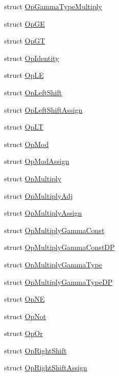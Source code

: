 \begin{DoxyCompactItemize}
\item 
struct \mbox{\hyperlink{structENSEM_1_1OpGammaTypeMultiply}{Op\+Gamma\+Type\+Multiply}}
\item 
struct \mbox{\hyperlink{structENSEM_1_1OpGE}{Op\+GE}}
\item 
struct \mbox{\hyperlink{structENSEM_1_1OpGT}{Op\+GT}}
\item 
struct \mbox{\hyperlink{structENSEM_1_1OpIdentity}{Op\+Identity}}
\item 
struct \mbox{\hyperlink{structENSEM_1_1OpLE}{Op\+LE}}
\item 
struct \mbox{\hyperlink{structENSEM_1_1OpLeftShift}{Op\+Left\+Shift}}
\item 
struct \mbox{\hyperlink{structENSEM_1_1OpLeftShiftAssign}{Op\+Left\+Shift\+Assign}}
\item 
struct \mbox{\hyperlink{structENSEM_1_1OpLT}{Op\+LT}}
\item 
struct \mbox{\hyperlink{structENSEM_1_1OpMod}{Op\+Mod}}
\item 
struct \mbox{\hyperlink{structENSEM_1_1OpModAssign}{Op\+Mod\+Assign}}
\item 
struct \mbox{\hyperlink{structENSEM_1_1OpMultiply}{Op\+Multiply}}
\item 
struct \mbox{\hyperlink{structENSEM_1_1OpMultiplyAdj}{Op\+Multiply\+Adj}}
\item 
struct \mbox{\hyperlink{structENSEM_1_1OpMultiplyAssign}{Op\+Multiply\+Assign}}
\item 
struct \mbox{\hyperlink{structENSEM_1_1OpMultiplyGammaConst}{Op\+Multiply\+Gamma\+Const}}
\item 
struct \mbox{\hyperlink{structENSEM_1_1OpMultiplyGammaConstDP}{Op\+Multiply\+Gamma\+Const\+DP}}
\item 
struct \mbox{\hyperlink{structENSEM_1_1OpMultiplyGammaType}{Op\+Multiply\+Gamma\+Type}}
\item 
struct \mbox{\hyperlink{structENSEM_1_1OpMultiplyGammaTypeDP}{Op\+Multiply\+Gamma\+Type\+DP}}
\item 
struct \mbox{\hyperlink{structENSEM_1_1OpNE}{Op\+NE}}
\item 
struct \mbox{\hyperlink{structENSEM_1_1OpNot}{Op\+Not}}
\item 
struct \mbox{\hyperlink{structENSEM_1_1OpOr}{Op\+Or}}
\item 
struct \mbox{\hyperlink{structENSEM_1_1OpRightShift}{Op\+Right\+Shift}}
\item 
struct \mbox{\hyperlink{structENSEM_1_1OpRightShiftAssign}{Op\+Right\+Shift\+Assign}}
\item 

\end{DoxyCompactItemize}
